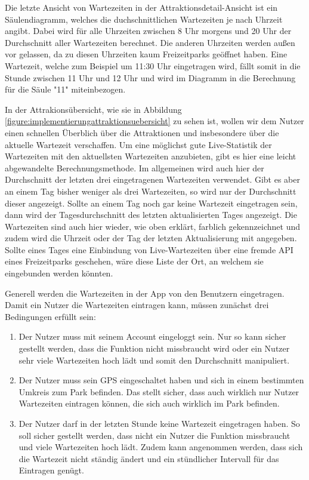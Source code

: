 Die letzte Ansicht von Wartezeiten in der Attraktionsdetail-Ansicht ist ein Säulendiagramm, welches die duchschnittlichen Wartezeiten je nach Uhrzeit angibt. Dabei wird für alle Uhrzeiten zwischen 8 Uhr morgens und 20 Uhr der Durchschnitt aller Wartezeiten berechnet. Die anderen Uhrzeiten werden außen vor gelassen, da zu diesen Uhrzeiten kaum Freizeitparks geöffnet haben. Eine Wartezeit, welche zum Beispiel um 11:30 Uhr eingetragen wird, fällt somit in die Stunde zwischen 11 Uhr und 12 Uhr und wird im Diagramm in die Berechnung für die Säule "11"  miteinbezogen.

In der Attrakionsübersicht, wie sie in Abbildung \ref{figure:implementierungattraktionsuebersicht} zu sehen ist, wollen wir dem Nutzer einen schnellen Überblich über die Attraktionen und insbesondere über die aktuelle Wartezeit verschaffen. Um eine möglichst gute Live-Statistik der Wartezeiten mit den aktuellsten Wartezeiten anzubieten, gibt es hier eine leicht abgewandelte Berechnungsmethode. Im allgemeinen wird auch hier der Durchschnitt der letzten drei eingetragenen Wartezeiten verwendet. Gibt es aber an einem Tag bisher weniger als drei Wartezeiten, so wird nur der Durchschnitt dieser angezeigt. Sollte an einem Tag noch gar keine Wartezeit eingetragen sein, dann wird der Tagesdurchschnitt des letzten aktualisierten Tages angezeigt. Die Wartezeiten sind auch hier wieder, wie oben erklärt, farblich gekennzeichnet und zudem wird die Uhrzeit oder der Tag der letzten Aktualisierung mit angegeben. Sollte eines Tages eine Einbindung von Live-Wartezeiten über eine fremde API eines Freizeitparks geschehen, wäre diese Liste der Ort, an welchem sie eingebunden werden könnten.

Generell werden die Wartezeiten in der App von den Benutzern eingetragen. Damit ein Nutzer die Wartezeiten eintragen kann, müssen zunächst drei Bedingungen erfüllt sein:
\begin{enumerate} 
\item Der Nutzer muss mit seinem Account eingeloggt sein. Nur so kann sicher gestellt werden, dass die Funktion nicht missbraucht wird oder ein Nutzer sehr viele Wartezeiten hoch lädt und somit den Durchschnitt manipuliert.
\item Der Nutzer muss sein GPS eingeschaltet haben und sich in einem bestimmten Umkreis zum Park befinden. Das stellt sicher, dass auch wirklich nur Nutzer Wartezeiten eintragen können, die sich auch wirklich im Park befinden.
\item Der Nutzer darf in der letzten Stunde keine Wartezeit eingetragen haben. So soll sicher gestellt werden, dass nicht ein Nutzer die Funktion missbraucht und viele Wartezeiten hoch lädt. Zudem kann angenommen werden, dass sich die Wartezeit nicht ständig ändert und ein stündlicher Intervall für das Eintragen genügt.
\end{enumerate}

